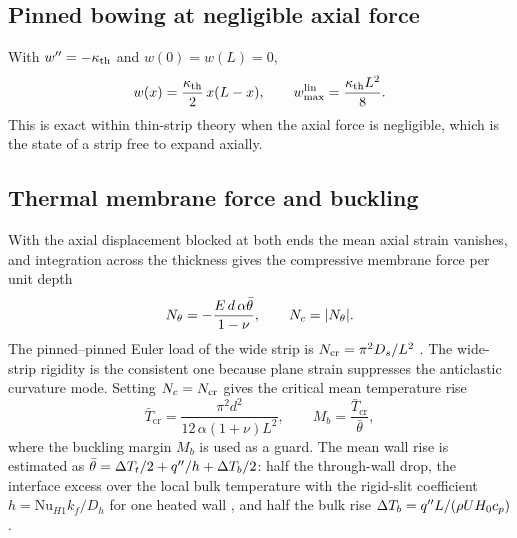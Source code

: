 \subsection{Pinned bowing at negligible axial force}
\label{sec:pinned}
With $w^{\prime\prime}=-\kappa_{\mathrm{th}}$ and $w(0)=w(L)=0$,
\begin{equation}
w(x)=\frac{\kappa_{\mathrm{th}}}{2}\,x(L-x),\qquad w_{\max}^{\mathrm{lin}}=\frac{\kappa_{\mathrm{th}} L^2}{8}.
\label{eq:wlin}
\end{equation}
This is exact within thin-strip theory when the axial force is negligible, which is the state of a
strip free to expand axially.

\subsection{Thermal membrane force and buckling}
\label{sec:buckling}
With the axial displacement blocked at both ends the mean axial strain vanishes, and integration
across the thickness gives the compressive membrane force per unit depth
\begin{equation}
N_\theta=-\frac{E\,d\,\alpha\bar\theta}{1-\nu},\qquad N_c=|N_\theta|. \label{eq:ntheta}
\end{equation}
The pinned--pinned Euler load of the wide strip is $N_{\mathrm{cr}}=\pi^2D_s/L^2$ \citep{timoshenko1961stability}.
The wide-strip rigidity is the consistent one because plane strain suppresses the anticlastic
curvature mode. Setting $N_c=N_{\mathrm{cr}}$ gives the critical mean temperature rise
\begin{equation}
\bar T_{\mathrm{cr}}=\frac{\pi^2d^2}{12\,\alpha(1+\nu)L^2},\qquad
M_b=\frac{\bar T_{\mathrm{cr}}}{\bar\theta}, \label{eq:tcr}
\end{equation}
where the buckling margin $M_b$ is used as a guard. The mean wall rise is estimated as
$\bar\theta=\Delta T_t/2+q^{\prime\prime}/h+\Delta T_b/2$: half the through-wall drop, the interface excess over
the local bulk temperature with the rigid-slit coefficient $h=\mathrm{Nu}_{H1}k_f/D_h$ for one heated
wall \citep{shah1978laminar}, and half the bulk rise $\Delta T_b=q^{\prime\prime} L/(\rho UH_0c_p)$.

